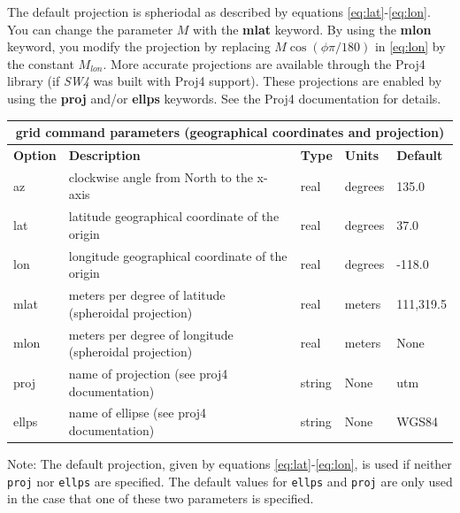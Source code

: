 \documentclass[11pt]{report}
\begin{document}
The default projection is spheriodal as described by equations \eqref{eq:lat}-\eqref{eq:lon}. You
can change the parameter $M$ with the {\bf mlat} keyword. By using the {\bf mlon} keyword, you
modify the projection by replacing $M\cos(\phi\pi/180)$ in \eqref{eq:lon} by the constant
$M_{lon}$. More accurate projections are available through the Proj4 library (if \emph{SW4} was
built with Proj4 support). These projections are enabled by using the {\bf proj} and/or {\bf ellps}
keywords. See the Proj4 documentation for details.
\begin{center}
\begin{tabular}{|l|p{8cm}|l|l|l|} \hline
\multicolumn{5}{|c|}{\bf grid command parameters (geographical coordinates and projection)}\\ \hline
\bf{Option} & \bf{Description} & \bf{Type} & \bf{Units} & \bf{Default}\\ \hline \hline
az & clockwise angle from North to the x-axis & real & degrees & 135.0 \\ \hline
lat & latitude geographical coordinate of the origin & real & degrees & 37.0 \\ \hline
lon & longitude geographical coordinate of the origin & real & degrees & -118.0 \\ \hline
mlat & meters per degree of latitude (spheroidal projection) & real & meters & 111,319.5 \\ \hline
mlon & meters per degree of longitude (spheroidal projection) & real & meters & None \\ \hline
proj & name of  projection (see proj4 documentation) & string & None & utm \\ \hline
ellps & name of ellipse (see proj4 documentation) & string & None & WGS84 \\ \hline
\end{tabular}
\end{center}
Note: The default projection, given by equations \eqref{eq:lat}-\eqref{eq:lon}, is used if neither \verb+proj+
nor \verb+ellps+ are specified. The default values for \verb+ellps+ and \verb+proj+ are only used in
the case that one of these two parameters is specified.


\end{document}
